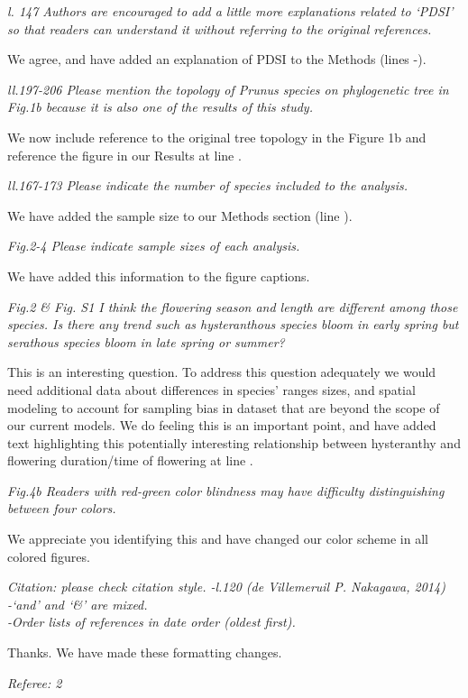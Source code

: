 \documentclass{article}[12pt]
\begin{document}
\emph{l. 147 Authors are encouraged to add a little more explanations related to ‘PDSI’ so that readers can understand it without referring to the original references.}

We agree, and have added an explanation of PDSI to the Methods (lines -).

\emph{ll.197-206 Please mention the topology of Prunus species on phylogenetic tree in Fig.1b because it is also one of the results of this study.}

We now include reference to the original tree topology in the Figure 1b and reference the figure in our Results at line .

\emph{ll.167-173 Please indicate the number of species included to the analysis.}

We have added the sample size to our Methods section (line ).

\emph{Fig.2-4 Please indicate sample sizes of each analysis.}

We have added this information to the figure captions.

\emph{Fig.2 & Fig. S1 I think the flowering season and length are different among those species. Is there any trend such as hysteranthous species bloom in early spring but serathous species bloom in late spring or summer?}

This is an interesting question. To address this question adequately we would need additional data about differences in species' ranges sizes, and spatial modeling to account for sampling bias in dataset that are beyond the scope of our current models. We do feeling this is an important point, and have added text highlighting this potentially interesting relationship between hysteranthy and flowering duration/time of flowering at line .

\emph{Fig.4b Readers with red-green color blindness may have difficulty distinguishing between four colors.}

We appreciate you identifying this and have changed our color scheme in all colored figures.

\emph{Citation: please check citation style.
-l.120 (de Villemeruil P. Nakagawa, 2014)\\
-‘and’ and ‘&’ are mixed.\\
-Order lists of references in date order (oldest first).}

Thanks. We have made these formatting changes.

\emph{Referee: 2}
\end{document}
